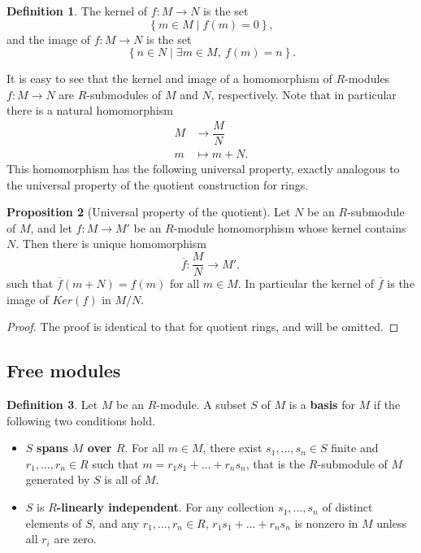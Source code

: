 \documentclass{article}
\newcommand{\rb}[1]{\left( #1 \right)}
\newcommand{\cb}[1]{\left\{ #1 \right\}}
\theoremstyle{definition}\newtheorem{definition}{Definition}[subsection]
\theoremstyle{definition}\newtheorem{remark}[definition]{Remark}
\theoremstyle{definition}\newtheorem*{example}{Example}
\theoremstyle{definition}\newtheorem*{note}{Note}
\newtheorem{proposition}[definition]{Proposition}
\begin{document}
\begin{definition}
The kernel of $ f : M \to N $ is the set
$$ \cb{m \in M \mid f\rb{m} = 0}, $$
and the image of $ f : M \to N $ is the set
$$ \cb{n \in N \mid \exists m \in M, \ f\rb{m} = n}. $$
\end{definition}

It is easy to see that the kernel and image of a homomorphism of $ R $-modules $ f : M \to N $ are $ R $-submodules of $ M $ and $ N $, respectively. Note that in particular there is a natural homomorphism
\begin{align*}
M & \to \dfrac{M}{N} \\
m & \mapsto m + N.
\end{align*}
This homomorphism has the following universal property, exactly analogous to the universal property of the quotient construction for rings.

\begin{proposition}[Universal property of the quotient]
Let $ N $ be an $ R $-submodule of $ M $, and let $ f : M \to M' $ be an $ R $-module homomorphism whose kernel contains $ N $. Then there is unique homomorphism
$$ \overline{f} : \dfrac{M}{N} \to M', $$
such that $ \overline{f}\rb{m + N} = f\rb{m} $ for all $ m \in M $. In particular the kernel of $ \overline{f} $ is the image of $ Ker\rb{f} $ in $ M / N $.
\end{proposition}

\begin{proof}
The proof is identical to that for quotient rings, and will be omitted.
\end{proof}

\subsection{Free modules}

\begin{definition}
Let $ M $ be an $ R $-module. A subset $ S $ of $ M $ is a \textbf{basis} for $ M $ if the following two conditions hold.
\begin{itemize}
\item $ S $ \textbf{spans $ M $ over $ R $}. For all $ m \in M $, there exist $ s_1, \dots, s_n \in S $ finite and $ r_1, \dots, r_n \in R $ such that $ m = r_1s_1 + \dots + r_ns_n $, that is the $ R $-submodule of $ M $ generated by $ S $ is all of $ M $.
\item $ S $ is \textbf{$ R $-linearly independent}. For any collection $ s_1, \dots, s_n $ of distinct elements of $ S $, and any $ r_1, \dots, r_n \in R $, $ r_1s_1 + \dots + r_ns_n $ is nonzero in $ M $ unless all $ r_i $ are zero.
\end{itemize}
\end{definition}
\end{document}
